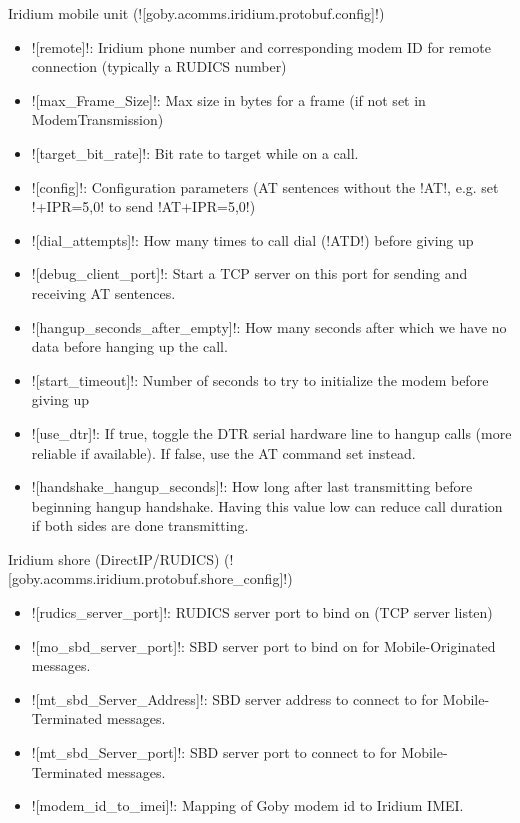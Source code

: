 Iridium mobile unit (![goby.acomms.iridium.protobuf.config]!)
\begin{itemize}
\item ![remote]!: Iridium phone number and corresponding modem ID for remote connection (typically a RUDICS number)
\item ![max_Frame_Size]!: Max size in bytes for a frame (if not set in ModemTransmission)
\item ![target_bit_rate]!: Bit rate to target while on a call.
\item ![config]!: Configuration parameters (AT sentences without the !AT!, e.g. set !+IPR=5,0! to send !AT+IPR=5,0!)
\item ![dial_attempts]!: How many times to call dial (!ATD!) before giving up
\item ![debug_client_port]!: Start a TCP server on this port for sending and receiving AT sentences.
\item ![hangup_seconds_after_empty]!: How many seconds after which we have no data before hanging up the call.
\item ![start_timeout]!: Number of seconds to try to initialize the modem before giving up
\item ![use_dtr]!: If true, toggle the DTR serial hardware line to hangup calls (more reliable if available). If false, use the AT command set instead.
\item ![handshake_hangup_seconds]!: How long after last transmitting before beginning hangup handshake. Having this value low can reduce call duration if both sides are done transmitting.
\end{itemize} 

Iridium shore (DirectIP/RUDICS) (![goby.acomms.iridium.protobuf.shore_config]!)
\begin{itemize}
\item ![rudics_server_port]!: RUDICS server port to bind on (TCP server listen)
\item ![mo_sbd_server_port]!: SBD server port to bind on for Mobile-Originated messages.
\item ![mt_sbd_Server_Address]!: SBD server address to connect to for Mobile-Terminated messages.
\item ![mt_sbd_Server_port]!: SBD server port to connect to for Mobile-Terminated messages.
\item ![modem_id_to_imei]!: Mapping of Goby modem id to Iridium IMEI.
\end{itemize} 


\DeleteShortVerb{\!}
